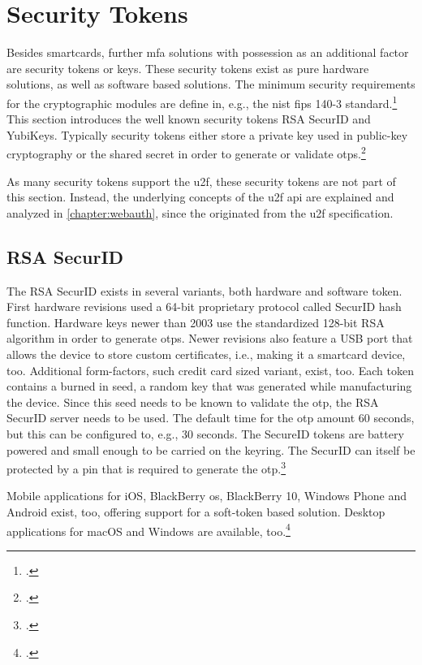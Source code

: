 \section{Security Tokens}

Besides smartcards, further \gls{mfa} solutions with possession as an additional factor are security tokens or keys. These security tokens exist as pure hardware solutions, as well as software based solutions. The minimum security requirements for the cryptographic modules are define in, e.g., the \gls{nist} \gls{fips} 140-3 standard.\footcites[See][]{FIPS140-3} This section introduces the well known security tokens \frqq RSA SecurID\flqq{} and \frqq YubiKeys\flqq. Typically security tokens either store a private key used in public-key cryptography or the shared secret in order to generate or validate \glspl{otp}.\footcites[See][Chapter 28.4.3]{1174011}

As many security tokens support the \gls{u2f}, these security tokens are not part of this section. Instead, the underlying concepts of the \gls{u2f} \gls{api} are explained and analyzed in \autoref{chapter:webauth}, since the \wa{} originated from the \gls{u2f} specification.

\subsection{RSA SecurID}

The RSA SecurID exists in several variants, both hardware and software token. First hardware revisions used a 64-bit proprietary protocol called \frqq SecurID hash function\flqq. Hardware keys newer than 2003 use the standardized 128-bit RSA algorithm in order to generate \glspl{otp}. Newer revisions also feature a USB port that allows the device to store custom certificates, i.e., making it a smartcard device, too. Additional form-factors, such credit card sized variant, exist, too. Each token contains a burned in seed, a random key that was generated while manufacturing the device. Since this seed needs to be known to validate the \gls{otp}, the RSA SecurID server needs to be used. The default time for the \gls{otp} amount 60 seconds, but this can be configured to, e.g., 30 seconds. The SecureID tokens are battery powered and small enough to be carried on the keyring. The SecurID can itself be protected by a \gls{pin} that is required to generate the \gls{otp}.\footcites[See][479--480]{eckert-it-sec-9}[See][296]{4351500}

Mobile applications for iOS, BlackBerry \gls{os}, BlackBerry 10, Windows Phone and Android exist, too, offering support for a soft-token based solution. Desktop applications for macOS and Windows are available, too.\footcites[See][3--6]{ibm-mfa}[See][49]{5542954}

